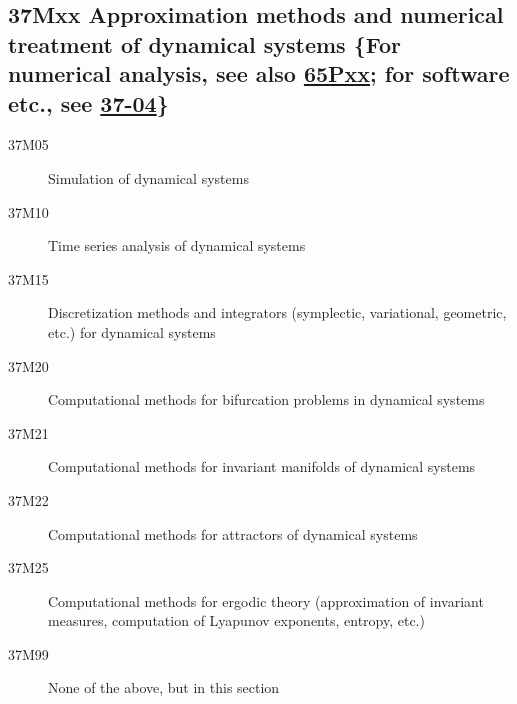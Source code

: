 \subsection*{37Mxx  Approximation methods and numerical treatment of dynamical systems \{For numerical analysis, see also \hyperref[65Pxx]{65Pxx}; for software etc., see \hyperref[37-04]{37-04}\} }\label{37Mxx}
\begin{description}  
\item [37M05]\label{37M05} Simulation of dynamical systems
\item [37M10]\label{37M10} Time series analysis of dynamical systems
\item [37M15]\label{37M15} Discretization methods and integrators (symplectic, variational, geometric, etc.)  for dynamical systems
\item [37M20]\label{37M20} Computational methods for bifurcation problems in dynamical systems
\item [37M21]\label{37M21} Computational methods for invariant manifolds of dynamical systems
\item [37M22]\label{37M22} Computational methods for attractors of dynamical systems
\item [37M25]\label{37M25} Computational methods for ergodic theory (approximation of invariant measures, computation of Lyapunov exponents, entropy, etc.) 
\item [37M99]\label{37M99} None of the above, but in this section
\end{description}
